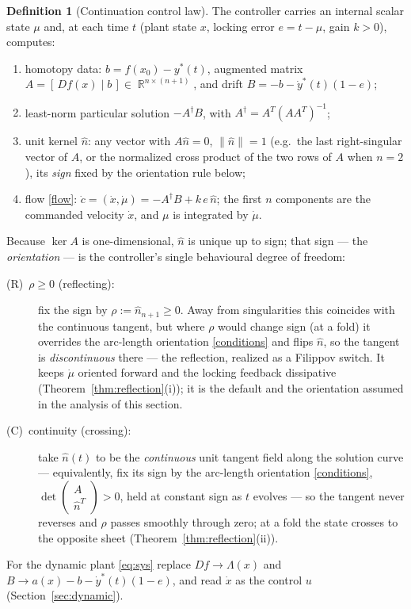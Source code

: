 \documentclass[11pt,american]{article}
\DeclareMathOperator{\R}{\mathbb{R}}
\theoremstyle{definition}
\newtheorem{definition}{Definition}
\theoremstyle{plain}
\theoremstyle{remark}
\begin{document}
\begin{definition}[Continuation control law]\label{def:controllaw}
The controller carries an internal scalar state $\mu$ and, at each time $t$ (plant state $x$, locking error $e=t-\mu$, gain $k>0$), computes:
\begin{enumerate}
\item[(i)] homotopy data: $b=f(x_0)-y^*(t)$, augmented matrix $A=[\,Df(x)\mid b\,]\in\R^{n\times(n+1)}$, and drift $B=-b-\dot y^*(t)(1-e)$;
\item[(ii)] least-norm particular solution $-A^\dagger B$, with $A^\dagger=A^T(AA^T)^{-1}$;
\item[(iii)] unit kernel $\hat n$: any vector with $A\hat n=0$, $\|\hat n\|=1$ (e.g.\ the last right-singular vector of $A$, or the normalized cross product of the two rows of $A$ when $n=2$), its \emph{sign} fixed by the orientation rule below;
\item[(iv)] flow \eqref{flow}: $\dot c=(\dot x,\dot\mu)=-A^\dagger B+k\,e\,\hat n$; the first $n$ components are the commanded velocity $\dot x$, and $\mu$ is integrated by $\dot\mu$.
\end{enumerate}
Because $\ker A$ is one-dimensional, $\hat n$ is unique up to sign; that sign --- the \emph{orientation} --- is the controller's single behavioural degree of freedom:
\begin{description}
\item[\normalfont(R)\ $\rho\ge0$ (reflecting):] fix the sign by $\rho:=\hat n_{n+1}\ge0$. Away from singularities this coincides with the continuous tangent, but where $\rho$ would change sign (at a fold) it overrides the arc-length orientation \eqref{conditions} and flips $\hat n$, so the tangent is \emph{discontinuous} there --- the reflection, realized as a Filippov switch. It keeps $\dot\mu$ oriented forward and the locking feedback dissipative (Theorem~\ref{thm:reflection}(i)); it is the default and the orientation assumed in the analysis of this section.
\item[\normalfont(C)\ continuity (crossing):] take $\hat n(t)$ to be the \emph{continuous} unit tangent field along the solution curve --- equivalently, fix its sign by the arc-length orientation \eqref{conditions}, $\det\!\begin{pmatrix}A\\ \hat n^{T}\end{pmatrix}>0$, held at constant sign as $t$ evolves --- so the tangent never reverses and $\rho$ passes smoothly through zero; at a fold the state crosses to the opposite sheet (Theorem~\ref{thm:reflection}(ii)).
\end{description}
For the dynamic plant \eqref{eq:sys} replace $Df\to\Lambda(x)$ and $B\to a(x)-b-\dot y^*(t)(1-e)$, and read $\dot x$ as the control $u$ (Section~\ref{sec:dynamic}).
\end{definition}
\end{document}
